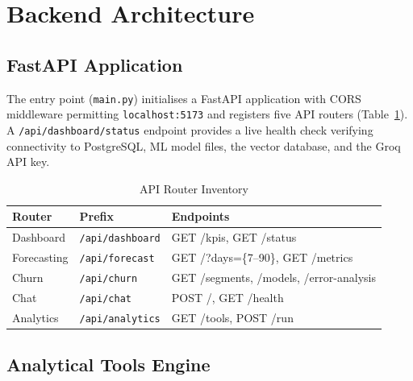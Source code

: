 \documentclass[conference]{IEEEtran}
\begin{document}
\section{Backend Architecture}

\subsection{FastAPI Application}

The entry point (\texttt{main.py}) initialises a FastAPI application with CORS middleware
permitting \texttt{localhost:5173} and registers five API routers (Table~\ref{tab:routers}).
A \texttt{/api/dashboard/status} endpoint provides a live health check verifying connectivity
to PostgreSQL, ML model files, the vector database, and the Groq API key.

\begin{table}[H]
\centering
\caption{API Router Inventory}
\label{tab:routers}
\scriptsize
\setlength{\tabcolsep}{3pt}
\begin{tabularx}{\linewidth}{@{}l l X@{}}
\toprule
\textbf{Router} & \textbf{Prefix} & \textbf{Endpoints} \\
\midrule
Dashboard   & \texttt{/api/dashboard}  & GET /kpis, GET /status \\
Forecasting & \texttt{/api/forecast}   & GET /?days=\{7–90\}, GET /metrics \\
Churn       & \texttt{/api/churn}      & GET /segments, /models, /error-analysis \\
Chat        & \texttt{/api/chat}       & POST /, GET /health \\
Analytics   & \texttt{/api/analytics}  & GET /tools, POST /run \\
\bottomrule
\end{tabularx}
\end{table}

\subsection{Analytical Tools Engine}
\end{document}
